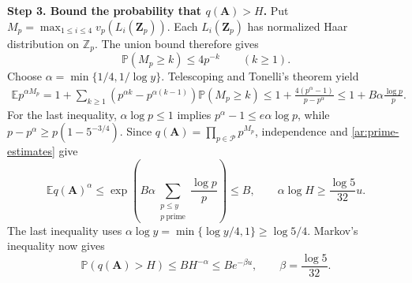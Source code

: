 \documentclass[twoside]{aomart}
\makeatletter
\theoremstyle{paperplain}
\theoremstyle{paperdefinition}
\renewenvironment{proof}[1][\proofname]{\par\pushQED{\qed}%
  \normalfont\topsep6\p@\@plus3\p@\relax\trivlist
  \item[\hskip\labelsep\itshape #1\@addpunct{.}]\ignorespaces
}{\popQED\endtrivlist\@endpefalse}
\newcommand{\E}{\mathbb E}
\newcommand{\Z}{\mathbb Z}
\newcommand{\Pp}{\mathbb P}
\numberwithin{equation}{section}
\makeatother
\begin{document}
\begin{proof}
\par
\medskip
\noindent\textbf{Step 3. Bound the probability that $q(\mathbf A)>H$.}
Put $M_p=\max_{1\le i\le4}v_p(L_i(\mathbf Z_p))$.
Each $L_i(\mathbf Z_p)$ has normalized Haar distribution on $\Z_p$.
The union bound therefore gives
\begin{equation*}
 \Pp(M_p\ge k)\le4p^{-k}\qquad(k\ge1).
\end{equation*}
Choose $\alpha=\min\{1/4,1/\log y\}$. Telescoping and Tonelli's
theorem yield
\begin{equation*}
 \begin{aligned}
 \E p^{\alpha M_p}
 =1+\sum_{k\ge1}(p^{\alpha k}-p^{\alpha(k-1)})\Pp(M_p\ge k)
 \le 1+\frac{4(p^\alpha-1)}{p-p^\alpha}
 \le1+B\alpha\frac{\log p}{p}.
 \end{aligned}
 \end{equation*}
For the last inequality, $\alpha\log p\le1$ implies
$p^\alpha-1\le e\alpha\log p$, while
$p-p^\alpha\ge p(1-5^{-3/4})$.
Since $\displaystyle q(\mathbf A)=\prod_{p\in\mathcal P}p^{M_p}$, independence
and \eqref{ar:prime-estimates} give
\begin{equation*}
 \E q(\mathbf A)^\alpha
 \le\exp\left(B\alpha\sum_{\substack{p\le y\\p\ \mathrm{prime}}}\frac{\log p}{p}\right)\le B,
 \qquad \alpha\log H\ge\frac{\log5}{32}u.
 \end{equation*}
The last inequality uses $\alpha\log y=\min\{\log y/4,1\}
\ge\log5/4$. Markov's inequality now gives
\begin{equation*}
 \Pp(q(\mathbf A)>H)\le BH^{-\alpha}\le Be^{-\beta u},
 \qquad \beta=\frac{\log5}{32}.
\end{equation*}


\end{proof}
\end{document}
